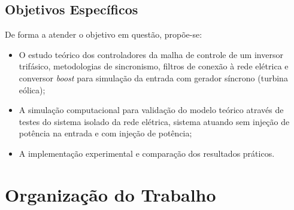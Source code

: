 \subsection{Objetivos Específicos}
De forma a atender o objetivo em questão, propõe-se:
\begin{itemize}
	\item O estudo teórico dos controladores da malha de controle de um inversor trifásico, metodologias de sincronismo, filtros de conexão à rede elétrica e conversor \textit{boost} para simulação da entrada com gerador síncrono (turbina eólica);
	\item A simulação computacional para validação do modelo teórico através de testes do sistema isolado da rede elétrica, sistema atuando sem injeção de potência na entrada e com injeção de potência;
	\item A implementação experimental e comparação dos resultados práticos.
\end{itemize}

\section{Organização do Trabalho}


